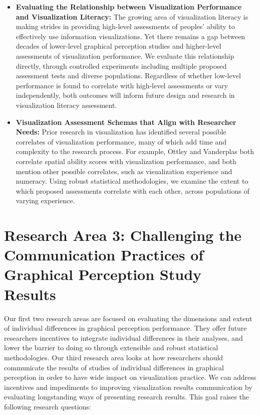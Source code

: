 \documentclass[11pt]{article}
\begin{document}
\vspace{-0.75em}
\begin{itemize}[noitemsep]
  \item \textbf{Evaluating the Relationship between Visualization Performance and Visualization Literacy:} The growing area of visualization literacy is making strides in providing high-level assessments of peoples' ability to effectively use information visualizations. Yet there remains a gap between decades of lower-level graphical perception studies and higher-level assessments of visualization performance. We evaluate this relationship directly, through controlled experiments including multiple proposed assessment tests and diverse populations. Regardless of whether low-level performance is found to correlate with high-level assessments or vary independently, both outcomes will inform future design and research in visualization literacy assessment.
  \item \textbf{Visualization Assessment Schemas that Align with Researcher Needs:} Prior research in visualization has identified several possible correlates of visualization performance, many of which add time and complexity to the research process. For example, Ottley \etal \cite{ottley2016improving} and Vanderplas \etal \cite{vanderplas2016spatial} both correlate spatial ability scores with visualization performance, and both mention other possible correlates, such as visualization experience and numeracy. Using robust statistical methodologies, we examine the extent to which proposed assessments correlate with each other, across populations of varying experience. 
\end{itemize}

\section{Research Area 3: Challenging the Communication Practices of Graphical Perception Study Results}
Our first two research areas are focused on evaluating the dimensions and extent of individual differences in graphical perception performance.
They offer future researchers incentives to integrate individual differences in their analyses, and lower the barrier to doing so through extensible and robust statistical methodologies.
Our third research area looks at how researchers should communicate the results of studies of individual differences in graphical perception in order to have wide impact on visualization practice.
We can address incentives and impediments to improving visualization results communication by evaluating longstanding ways of presenting research results.
This goal raises the following research questions:
\end{document}
